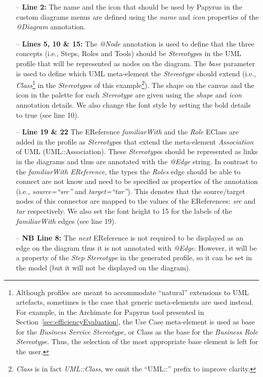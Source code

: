 \begin{itemize}
	\item[--] \textbf{Line 2:} The name and the icon that should be used by Papyrus in the custom diagrams menus are defined using the \textit{name} and \textit{icon} properties of the \textit{@Diagram} annotation.
	\item[--] \textbf{Lines 5, 10 \& 15:} The \textit{@Node} annotation is used to define that the three concepts (i.e., Steps, Roles and Tools) should be \textit{Stereotype}s in the UML profile that will be represented as nodes on the diagram. 
	The \textit{base} parameter is used to define which UML meta-element the \textit{Stereotype} should extend (i.e., \textit{Class}\footnote{Although profiles are meant to accommodate ``natural'' extensions to UML artefacts, sometimes is the case that generic meta-elements are used instead. 
	For example, in the Archimate for Papyrus tool presented in Section~\ref{sec:efficiencyEvaluation}, the Use Case meta-element is used as base for the \textit{Business Service} \textit{Stereotype}, or Class as the base for the \textit{Business Role} \textit{Stereotype}. 
	Thus, the selection of the most appropriate base element is left for the user.} in the \textit{Stereotype}s of this example\footnote{\textit{Class} is in fact \textit{UML::Class}, we omit the ``UML::'' prefix to improve clarity.}). The shape on the canvas and the icon in the palette for each \textit{Stereotype} are given using the \textit{shape} and \textit{icon} annotation details. We also change the font style by setting the bold details to true (see line 10).
	\item[--] \textbf{Line 19 \& 22} The EReference \textit{familiarWith} and the \textit{Role} EClass are added in the profile as \textit{Stereotype}s that extend the meta-element \textit{Association} of UML (UML::Association). 
	These \textit{Stereotype}s should be represented as links in the diagrams and thus are annotated with the \textit{@Edge} string.
	In contrast to the \textit{familiarWith EReference}, the types the 
	\textit{Roles} edge should be able to connect are not know and need to be 
	specified as properties of the annotation (i.e., \textit{source=``src''} 
	and \textit{target=``tar''}). 
	This denotes that the source/target nodes of this connector are mapped to the values of the
	EReferences: \textit{src} and \textit{tar} respectively. 
	We also set the font height to 15 for the labels of the \textit{familiarWith} edges (see line 19).
	\item[--] \textbf{NB Line 8:} The \textit{next} EReference is not required to be displayed as an edge on the diagram thus it is not annotated with \emph{@Edge}. 
	However, it will be a property of the \textit{Step} \textit{Stereotype} in the generated profile, so it can be set in the model (but it will not be displayed on the diagram).
\end{itemize}


